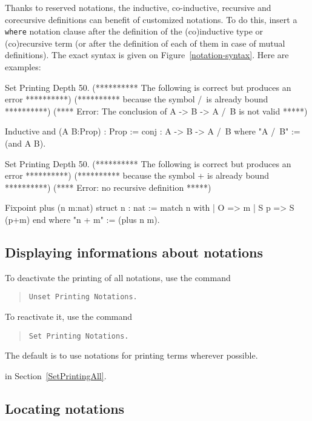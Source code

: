Thanks to reserved notations, the inductive, co-inductive, recursive
and corecursive definitions can benefit of customized notations. To do
this, insert a {\tt where} notation clause after the definition of the
(co)inductive type or (co)recursive term (or after the definition of
each of them in case of mutual definitions). The exact syntax is given
on Figure~\ref{notation-syntax}. Here are examples:

\begin{coq_eval}
Set Printing Depth 50.
(********** The following is correct but produces an error **********)
(********** because the symbol /\ is already bound **********)
(**** Error: The conclusion of A -> B -> A /\ B is not valid *****)
\end{coq_eval}

\begin{coq_example*}
Inductive and (A B:Prop) : Prop := conj : A -> B -> A /\ B 
where "A /\ B" := (and A B).
\end{coq_example*}

\begin{coq_eval}
Set Printing Depth 50.
(********** The following is correct but produces an error **********)
(********** because the symbol + is already bound **********)
(**** Error: no recursive definition *****)
\end{coq_eval}

\begin{coq_example*}
Fixpoint plus (n m:nat) {struct n} : nat :=
  match n with
  | O => m
  | S p => S (p+m)
  end
where "n + m" := (plus n m).
\end{coq_example*}

\subsection{Displaying informations about notations
}

To deactivate the printing of all notations, use the command
\begin{quote}
\tt Unset Printing Notations.
\end{quote}
To reactivate it, use the command
\begin{quote}
\tt Set Printing Notations.
\end{quote}
The default is to use notations for printing terms wherever possible.

 in Section~\ref{SetPrintingAll}.

\subsection{Locating notations
\label{LocateSymbol}}

